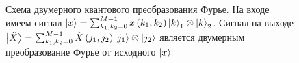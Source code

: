 \begin{figure}
\centering



\caption{Схема двумерного квантового преобразования Фурье. На входе
  имеем сигнал $\ket{x} = \sum_{k_1,k_2=0}^{M-1} x\left(k_1,
  k_2\right)\ket{k}_1 \otimes \ket{k}_2$. Сигнал на 
  выходе $\ket{\tilde{X}} = \sum_{k_1,k_2=0}^{M-1} \tilde{X}\left(j_1,
  j_2\right) \ket{j_1} \otimes \ket{j_2}$ является двумерным
  преобразование Фурье от 
  исходного $\ket{x}$}
\label{figQuantCompQuantFourier2d}
\end{figure}
